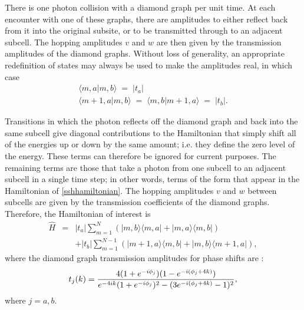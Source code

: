 \documentclass[twocolumn,amsmath, amssymb, superscriptaddress, pra]{revtex4}
\begin{document}
There is one photon collision with a diamond graph per unit time. At each
encounter with one of these graphs, there are amplitudes to either reflect
back from it into the original subsite, or to be transmitted through to an
adjacent subcell. The hopping amplitudes $v$ and $w$ are then given by the
transmission amplitudes of the diamond graphs. Without loss of generality, an
appropriate redefinition of states may always be used to make the amplitudes
real, in which case
\begin{eqnarray}\langle m,a|m,b\rangle \; =\; |t_a | \label{vta}\\
\langle m+1,a|m,b\rangle \; =\; \langle m,b|m+1,a\rangle \; =\; |t_b |
.\label{wtb}
\end{eqnarray}

Transitions in which the photon reflects off the diamond graph and back into
the same subcell give diagonal contributions to the Hamiltonian that simply
shift all of the energies up or down by the same amount; i.e. they define the
zero level of the energy. These terms can therefore be ignored for current
purposes. The remaining terms are those that take a photon from one subcell
to an adjacent subcell in a single time step; in other words, terms of the
form that appear in the Hamiltonian of \ref{sshhamiltonian}. The hopping
amplitudes $v$ and $w$ between subcells are given by the transmission
coefficients of the diamond graphs. Therefore, the Hamiltonian of interest is
\begin{eqnarray}\hat H &=& |t_a | \sum_{m=1}^N \left( |m,b\rangle \langle m,a| +  |m,a\rangle \langle m,b|  \right)\label{sshhamiltonianv2} \\
& & + |t_b |\sum_{m=1}^{N-1} \left( |m+1,a\rangle \langle m,b| +  |m,b\rangle \langle m+1,a|  \right) ,\nonumber\end{eqnarray} where the diamond graph
transmission amplitudes for phase shifts are \cite{fh1,fh2,fh3}:
\begin{equation} t_j(k) =  {{4(1+e^{-i\phi_j})(1-e^{-i(\phi_j+4k)})}\over
{e^{-4ik}(1+e^{-i\phi_j})^2-(3e^{-i(\phi_j+4k)}-1)^2}} ,\label{Teq}
\end{equation} where $j=a,b$.
\end{document}
